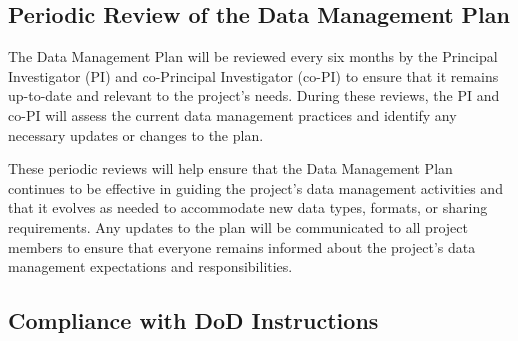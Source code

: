 \documentclass[onecolumn, compsoc,12pt]{IEEEtran}
\begin{document}
\subsection{Periodic Review of the Data Management Plan}

The Data Management Plan will be reviewed every six months by the Principal Investigator (PI) and co-Principal Investigator (co-PI) to ensure that it remains up-to-date and relevant to the project's needs. During these reviews, the PI and co-PI will assess the current data management practices and identify any necessary updates or changes to the plan.

These periodic reviews will help ensure that the Data Management Plan continues to be effective in guiding the project's data management activities and that it evolves as needed to accommodate new data types, formats, or sharing requirements. Any updates to the plan will be communicated to all project members to ensure that everyone remains informed about the project's data management expectations and responsibilities.

\subsection{Compliance with DoD Instructions}
\end{document}
